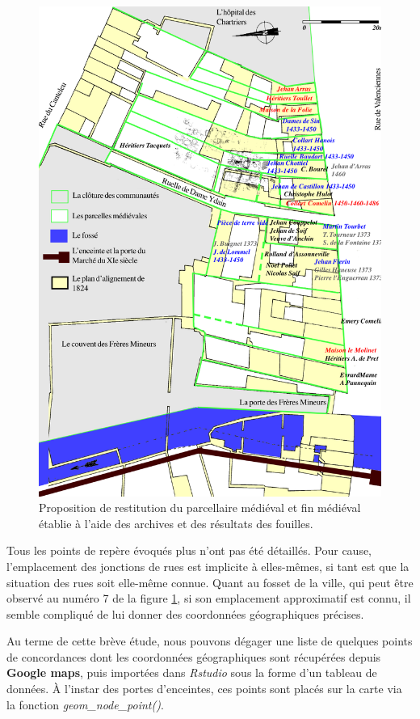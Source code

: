 \begin{figure}
    \centering
    \includegraphics[scale=0.80]{3.Results/Img/demolon99.png}
    \caption{Proposition de restitution du parcellaire médiéval et fin médiéval établie à l’aide des archives et des résultats des fouilles.}
    \label{fig:demolon99}
\end{figure}

Tous les points de repère évoqués plus n'ont pas été détaillés. Pour cause, l'emplacement des jonctions de rues est implicite à elles-mêmes, si tant est que la situation des rues soit elle-même connue. 
Quant au fosset de la ville, qui peut être observé au numéro 7 de la figure \ref{fig:demolon99}, si son emplacement approximatif est connu, il semble compliqué de lui donner des coordonnées géographiques précises. 

Au terme de cette brève étude, nous pouvons dégager une liste de quelques points de concordances dont les coordonnées géographiques sont récupérées depuis \textbf{Google maps}, puis importées dans \textit{Rstudio} sous la forme d'un tableau de données. À l’instar des portes d'enceintes, ces points sont placés sur la carte via la fonction \textit{geom\_node\_point()}.

